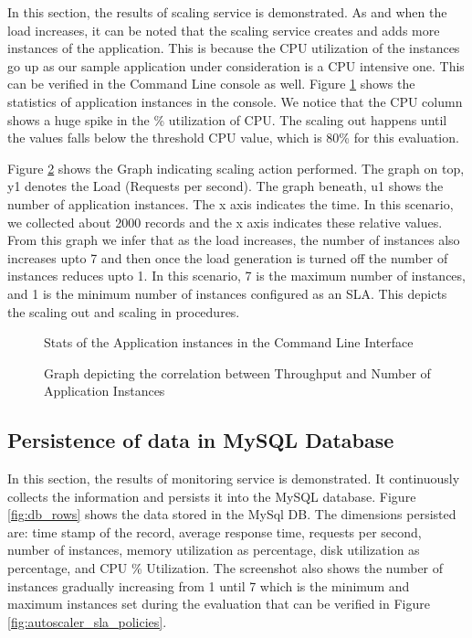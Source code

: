 \documentclass[article,type=msc,colorback,12pt,accentcolor=tud8b,table]{tudthesis}
\begin{document}
	In this section, the results of scaling service is demonstrated. As and when the load increases, it can be noted that the scaling service creates and adds more instances of the application. This is because the CPU utilization of the instances go up as our sample application under consideration is a CPU intensive one. This can be verified in the Command Line console as well. Figure \ref{fig:cf_cli} shows the statistics of application instances in the console. We notice that the CPU column shows a huge spike in the \% utilization of CPU. The scaling out happens until the values falls below the threshold CPU value, which is 80\% for this evaluation.
	
	Figure \ref{fig:responsetTime_Instances} shows the Graph indicating scaling action performed. The graph on top, y1 denotes the Load (Requests per second). The graph beneath, u1 shows the number of application instances. The x axis indicates the time. In this scenario, we collected about 2000 records and the x axis indicates these relative values. From this graph we infer that as the load increases, the number of instances also increases upto 7 and then once the load generation is turned off the number of instances reduces upto 1. In this scenario, 7 is the maximum number of instances, and 1 is the minimum number of instances configured as an SLA. This depicts the scaling out and scaling in procedures. 
	
	  \begin{figure}[h]
	  	\begin{center}
	  		\makebox[\textwidth]{\texttt{[image: E4]}}
	  	\end{center}
	  	\caption{Stats of the Application instances in the Command Line Interface}
	  	\label{fig:cf_cli}
	  \end{figure}
	  
	  	  \begin{figure}[h]
	  	  	\begin{center}
	  	  		\makebox[\textwidth]{\texttt{[image: E5]}}
	  	  	\end{center}
	  	  	\caption{Graph depicting the correlation between Throughput and Number of Application Instances}
	  	  	\label{fig:responsetTime_Instances}
	  	  \end{figure}
	
	\subsection{Persistence of data in MySQL Database}
		In this section, the results of monitoring service is demonstrated. It continuously collects the information and persists it into the MySQL database.  Figure \ref{fig:db_rows} shows the data stored in the MySql DB. The dimensions persisted are: time stamp of the record, average response time, requests per second, number of instances, memory utilization as percentage, disk utilization as percentage, and CPU \% Utilization. The screenshot also shows the number of instances gradually increasing from 1 until 7 which is the minimum and maximum instances set during the evaluation that can be verified in Figure \ref{fig:autoscaler_sla_policies}. 
	
\end{document}

